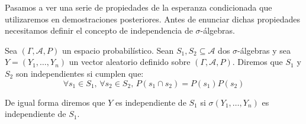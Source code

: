 Pasamos a ver una serie de propiedades de la esperanza condicionada que utilizaremos en demostraciones posteriores. Antes de enunciar dichas propiedades necesitamos definir el concepto de independencia de $\sigma$-álgebras.

\begin{definicion}
Sea $(\Gamma, \mathcal{A}, P)$ un espacio probabilístico. Sean $S_1, S_2 \subseteq \mathcal{A}$ dos $\sigma$-álgebras y sea $Y=(Y_1,\ldots ,Y_n)$ un vector aleatorio definido sobre $(\Gamma, \mathcal{A}, P)$. Diremos que $S_1$ y $S_2$ son independientes si cumplen que:
$$\forall s_1\in S_1 \text{, }\forall s_2\in S_2\text{, } P(s_1\cap s_2) = P(s_1)P(s_2)$$

De igual forma diremos que $Y$ es independiente de $S_1$ si $\sigma(Y_1,\ldots ,Y_n)$ es independiente de $S_1$.
\end{definicion}


